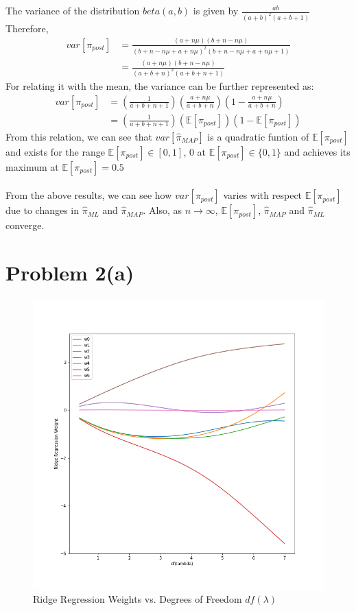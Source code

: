 \documentclass[openany,11pt]{homework}
\begin{document}
The variance of the distribution $beta(a, b)$ is given by $\frac{ab}{(a+b)^2(a+b+1)}$ \\
Therefore, \\
\begin{align}
var[\pi_{post}] & = \frac{(a + n\mu)(b + n - n\mu)}{(b + n - n\mu + a + n\mu)^2(b + n - n\mu + a + n\mu +1)} \\
& = \frac{(a + n\mu)(b + n - n\mu)}{(a + b + n)^2(a + b + n+1)}
\end{align}
For relating it with the mean, the variance can be further represented as:
\begin{align}
	var[\pi_{post}] & = \left(\frac{1}{a+b+n+1}\right)\left(\frac{a+n\mu}{a+b+n}\right)\left(1-\frac{a+n\mu}{a+b+n}\right) \\
	& = \left(\frac{1}{a+b+n+1}\right)\left(\mathbb{E}[\pi_{post}]\right)\left(1-\mathbb{E}[\pi_{post}]\right)
\end{align}
From this relation, we can see that $var[\hat{\pi}_{MAP}]$ is a quadratic funtion of $\mathbb{E}[\pi_{post}]$ and exists for the range $\mathbb{E}[\pi_{post}] \in [0, 1]$, 0 at $\mathbb{E}[\pi_{post}] \in \{0, 1\}$ and achieves its maximum at $\mathbb{E}[\pi_{post}] = 0.5$
\\
\\
From the above results, we can see how $var[\pi_{post}]$ varies with respect $\mathbb{E}[\pi_{post}]$ due to changes in $\hat{\pi}_{ML}$ and $\hat{\pi}_{MAP}$. Also, as $n \to \infty$, $\mathbb{E}[\pi_{post}]$, $\hat{\pi}_{MAP}$ and $\hat{\pi}_{ML}$ converge.



\section*{Problem 2(a)}
\begin{figure}[h]
	\includegraphics[width=\textwidth]{wrr_vs_dfl}
	\caption{Ridge Regression Weights vs. Degrees of Freedom $df(\lambda)$}
\end{figure}
\end{document}

